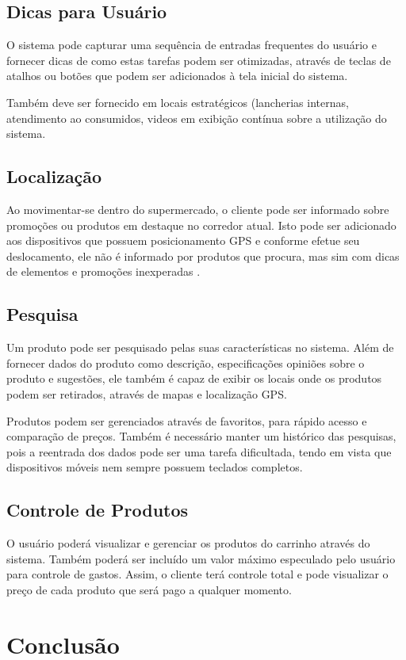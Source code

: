 \documentclass{article}
\begin{document}
\subsection{Dicas para Usuário}


O sistema pode capturar uma sequência de entradas frequentes do usuário e
fornecer dicas de como estas tarefas podem ser otimizadas, através de teclas de
atalhos ou botões que podem ser adicionados à tela inicial do sistema.

Também deve ser fornecido em locais estratégicos (lancherias internas,
atendimento ao consumidos, videos em exibição contínua sobre a utilização do
sistema.

\subsection{Localização}


Ao movimentar-se dentro do supermercado, o cliente pode ser informado sobre
promoções ou produtos em destaque no corredor atual. Isto pode ser adicionado
aos dispositivos que possuem posicionamento GPS e conforme efetue seu
deslocamento, ele não é informado por produtos que procura, mas sim com dicas de
elementos e promoções inexperadas \cite{canny2006}.

\subsection{Pesquisa}


Um produto pode ser pesquisado pelas suas características no sistema. Além de
fornecer dados do produto como descrição, especificações opiniões sobre o
produto e sugestões, ele também é capaz de exibir os locais onde os produtos
podem ser retirados, através de mapas e localização GPS.


Produtos podem ser gerenciados através de favoritos, para rápido acesso e
comparação de preços. Também é necessário manter um histórico das pesquisas,
pois a reentrada dos dados pode ser uma tarefa dificultada, tendo em vista que
dispositivos móveis nem sempre possuem teclados completos.

\subsection{Controle de Produtos}

O usuário poderá visualizar e gerenciar os produtos do carrinho através do
sistema. Também poderá ser incluído um valor máximo especulado pelo usuário para
controle de gastos. Assim, o cliente terá controle total e pode visualizar o
preço de cada produto que será pago a qualquer momento.

\section{Conclusão}



\end{document}
